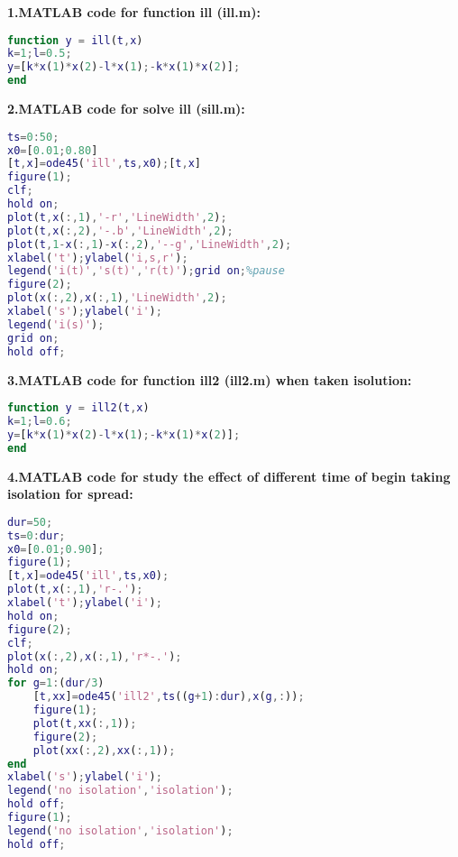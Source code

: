 \textbf{1.MATLAB code for function ill (ill.m):}
\begin{lstlisting}[language=Matlab]
function y = ill(t,x)
k=1;l=0.5;
y=[k*x(1)*x(2)-l*x(1);-k*x(1)*x(2)];
end
\end{lstlisting}\nline%
%
\textbf{2.MATLAB code for solve ill (sill.m):}
\begin{lstlisting}[language=Matlab]
ts=0:50;
x0=[0.01;0.80]
[t,x]=ode45('ill',ts,x0);[t,x]
figure(1);
clf;
hold on;
plot(t,x(:,1),'-r','LineWidth',2);
plot(t,x(:,2),'-.b','LineWidth',2);
plot(t,1-x(:,1)-x(:,2),'--g','LineWidth',2);
xlabel('t');ylabel('i,s,r');
legend('i(t)','s(t)','r(t)');grid on;%pause
figure(2);
plot(x(:,2),x(:,1),'LineWidth',2);
xlabel('s');ylabel('i');
legend('i(s)');
grid on;
hold off;
\end{lstlisting}\nline%
%
\textbf{3.MATLAB code for function ill2 (ill2.m) when taken
isolution:} \begin{lstlisting}[language=Matlab]
function y = ill2(t,x)
k=1;l=0.6;
y=[k*x(1)*x(2)-l*x(1);-k*x(1)*x(2)];
end
\end{lstlisting}\nline%
%
\textbf{4.MATLAB code for study the effect of different time of
begin taking isolation for spread:}
\begin{lstlisting}[language=Matlab]
dur=50;
ts=0:dur;
x0=[0.01;0.90];
figure(1);
[t,x]=ode45('ill',ts,x0);
plot(t,x(:,1),'r-.');
xlabel('t');ylabel('i');
hold on;
figure(2);
clf;
plot(x(:,2),x(:,1),'r*-.');
hold on;
for g=1:(dur/3)
    [t,xx]=ode45('ill2',ts((g+1):dur),x(g,:));
    figure(1);
    plot(t,xx(:,1));
    figure(2);
    plot(xx(:,2),xx(:,1));
end
xlabel('s');ylabel('i');
legend('no isolation','isolation');
hold off;
figure(1);
legend('no isolation','isolation');
hold off;
\end{lstlisting}\nline%
%